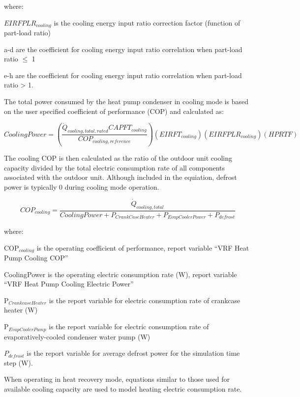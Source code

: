 where:

\(EIRFPLR_{cooling}\) is the cooling energy input ratio correction factor (function of part-load ratio)

a-d are the coefficient for cooling energy input ratio correlation when part-load ratio \(\leq\) 1

e-h are the coefficient for cooling energy input ratio correlation when part-load ratio > 1.

The total power consumed by the heat pump condenser in cooling mode is based on the user specified coefficient of performance (COP) and calculated as:

\begin{equation}
  CoolingPower = \left( \frac{\dot{Q}_{cooling,total,rated} CAPFT_{cooling}}{COP_{cooling,reference}} \right) \left( EIRFT_{cooling} \right) \left( EIRFPLR_{cooling} \right) \left( HPRTF \right)
\end{equation}

The cooling COP is then calculated as the ratio of the outdoor unit cooling capacity divided by the total electric consumption rate of all components associated with the outdoor unit. Although included in the equiation, defrost power is typically 0 during cooling mode operation.

\begin{equation}
  COP_{cooling} = \frac{\dot{Q}_{cooling,total}}{CoolingPower + P_{CrankCaseHeater} + P_{EvapCoolerPower} + P_{defrost}}
\end{equation}

where:

COP\(_{cooling}\) is the operating coefficient of performance, report variable ``VRF Heat Pump Cooling COP''

CoolingPower is the operating electric consumption rate (W), report variable ``VRF Heat Pump Cooling Electric Power''

P\(_{CrankcaseHeater}\) is the report variable for electric consumption rate of crankcase heater (W)

P\(_{EvapCoolerPump}\) is the report variable for electric consumption rate of evaporatively-cooled condenser water pump (W)

\({P_{defrost}}\) is the report variable for average defrost power for the simulation time step (W).

When operating in heat recovery mode, equations similar to those used for available cooling capacity are used to model heating electric consumption rate.

